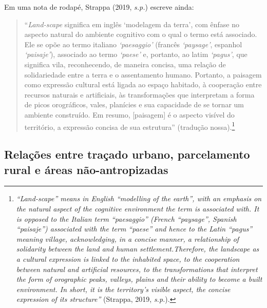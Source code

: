 \documentclass[12pt, a4paper]{book} %
\begin{document}
                    Em uma nota de rodapé, Strappa (2019, \textit{s.p.}) escreve ainda: %
                    \begin{quotation}
                        ``\emph{Land-scape} significa em inglês `modelagem da terra', com ênfase no aspecto natural do ambiente cognitivo com o qual o termo está associado. Ele se opõe ao termo italiano \emph{`paesaggio'} (francês \emph{`paysage'}, espanhol \emph{`paisaje'}), associado ao termo \emph{`paese'} e, portanto, ao latim \emph{`pagus'}, que significa vila, reconhecendo, de maneira concisa, uma relação de solidariedade entre a terra e o assentamento humano. Portanto, a paisagem como expressão cultural está ligada ao espaço habitado, à cooperação entre recursos naturais e artificiais, às transformações que interpretam a forma de picos orográficos, vales, planícies e sua capacidade de se tornar um ambiente construído. Em resumo, [paisagem] é o aspecto visível do território, a expressão concisa de sua estrutura'' (tradução nossa).\footnote[12]{\textit{``Land-scape'' means in English ``modelling of the earth'', with an emphasis on the natural aspect of the cognitive environment the term is associated with. It is opposed to the Italian term ``paesaggio'' (French ``paysage'', Spanish ``paisaje'') associated with the term ``paese'' and hence to the Latin ``pagus'' meaning village, acknowledging, in a concise manner, a relationship of solidarity between the land and human settlement.Therefore, the landscape as a cultural expression is linked to the inhabited space, to the cooperation between natural and artificial resources, to the transformations that interpret the form of orographic peaks, valleys, plains and their ability to become a built environment. In short, it is the territory’s visible aspect, the concise expression of its structure''} (Strappa, 2019, \textit{s.p.}).}
                    \end{quotation}

                \subsection{Relações entre traçado urbano, parcelamento rural e áreas não-antropizadas}
                
\end{document}
